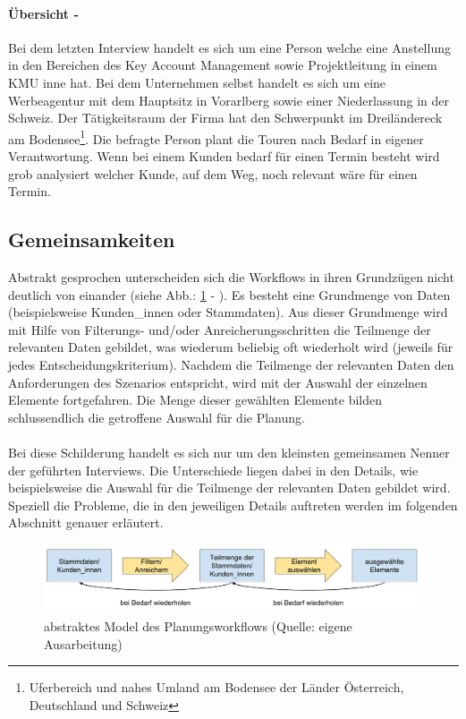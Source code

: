 \documentclass[Bachelorarbeit.tex]{subfiles}
\begin{document}
\paragraph*{Übersicht - }
Bei dem letzten Interview handelt es sich um eine Person welche eine Anstellung in den Bereichen des Key Account Management sowie Projektleitung in einem \ac{KMU} inne hat.
Bei dem Unternehmen selbst handelt es sich um eine Werbeagentur mit dem Hauptsitz in Vorarlberg sowie einer Niederlassung in der Schweiz.
Der Tätigkeitsraum der Firma hat den Schwerpunkt im Dreiländereck am Bodensee\footnote{Uferbereich und nahes Umland am Bodensee der Länder Österreich, Deutschland und Schweiz}. 
Die befragte Person plant die Touren nach Bedarf in eigener Verantwortung.
Wenn bei einem Kunden bedarf für einen Termin besteht wird grob analysiert welcher Kunde, auf dem Weg, noch relevant wäre für einen Termin.

\subsection{Gemeinsamkeiten}
\label{subsubsec:Ergebnisse der Interviews:gemeinsamkeiten}
Abstrakt gesprochen unterscheiden sich die Workflows in ihren Grundzügen nicht deutlich von einander (siehe Abb.: \ref{fig:abstrakterWorkflowPlannung} - ). 
Es besteht eine Grundmenge von Daten (beispielsweise Kunden\_innen oder Stammdaten). 
Aus dieser Grundmenge wird mit Hilfe von Filterungs- und/oder Anreicherungsschritten die Teilmenge der relevanten Daten gebildet, was wiederum beliebig oft wiederholt wird (jeweils für jedes Entscheidungskriterium).
Nachdem die Teilmenge der relevanten Daten den Anforderungen des Szenarios entspricht, wird mit der Auswahl der einzelnen Elemente fortgefahren.
Die Menge dieser gewählten Elemente bilden schlussendlich die getroffene Auswahl für die Planung.\\
\\
Bei diese Schilderung handelt es sich nur um den kleinsten gemeinsamen Nenner der geführten Interviews.
Die Unterschiede liegen dabei in den Details, wie beispielsweise die Auswahl für die Teilmenge der relevanten Daten gebildet wird.
Speziell die Probleme, die in den jeweiligen Details auftreten werden im folgenden Abschnitt genauer erläutert.

\begin{figure}[h]
	\includegraphics[width=\linewidth]{img/analyse/abstrakterWorkflowPlannung}
	\caption[abstrakter Planungsworkflow]{abstraktes Model des Planungsworkflows (Quelle: eigene Ausarbeitung)}
	\label{fig:abstrakterWorkflowPlannung}
\end{figure}
\end{document}
